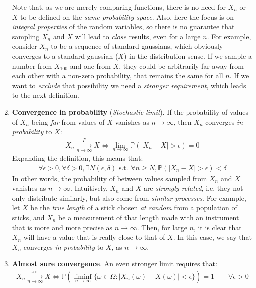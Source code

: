\documentclass[../template.tex]{subfiles}
\begin{document}
\begin{enumerate}
    Note that, as we are merely comparing functions, there is no need for $X_n$ or $X$ to be defined on the \textit{same probability space}. Also, here the focus is on \textit{integral properties} of the random variables, so there is no guarantee that sampling $X_n$ and $X$ will lead to \textit{close} results, even for a large $n$. For example, consider $X_n$ to be a sequence of standard gaussians, which obviously converges to a standard gaussian ($X$) in the distribution sense. If we sample a number from $X_{100}$ and one from $X$, they could be arbitrarily far away from each other with a non-zero probability, that remains the same for all $n$. If we want to \textit{exclude} that possibility we need a \textit{stronger requirement}, which leads to the next definition.   
    \item \textbf{Convergence in probability} (\textit{Stochastic limit}). If the probability of values of $X_n$ being \textit{far} from values of $X$ vanishes as $n \to\infty$, then $X_n$ converges \textit{in probability} to $X$:
    \begin{align*}
        X_n  \xrightarrow[n \to \infty]{P} X \Leftrightarrow \lim_{n \to\infty} \mathbb{P}(|X_n - X| > \epsilon) = 0
    \end{align*} 
    Expanding the definition, this means that:
    \begin{align*}
        \forall \epsilon> 0, \forall \delta > 0, \exists N(\epsilon , \delta) \text{ s.t. } \forall n \geq N, \mathbb{P}(|X_n - X| > \epsilon) < \delta 
    \end{align*}
    In other words, the probability of  between values sampled from $X_n$ and $X$ vanishes as $n \to \infty$. Intuitively, $X_n$ and $X$ are \textit{strongly related}, i.e. they not only distribute similarly, but also come from \textit{similar processes}. For example, let $X$ be the \textit{true length} of a stick chosen \textit{at random} from a population of sticks, and $X_n$ be a measurement of that length made with an instrument that is more and more precise as $n \to\infty$. Then, for large $n$, it is clear that $X_n$ will have a value that is really close to that of $X$. In this case, we say that $X_n$ converges \textit{in probability} to $X$, as $n \to\infty$.  
    \item \textbf{Almost sure convergence}. An even stronger limit requires that:
    \begin{align*}
        X_n  \xrightarrow[n \to \infty]{\mathrm{a.s.}} X \Leftrightarrow  \mathbb{P}\left(\liminf_{n \to \infty} \{\omega \in \Omega \colon |X_n(\omega) - X(\omega)| < \epsilon\}\right) = 1 \qquad \forall \epsilon > 0

\end{align*}
\end{enumerate}
\end{document}
